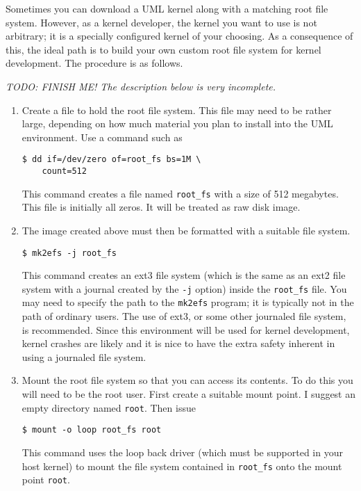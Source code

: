 \documentclass{article}
\newcommand{\command}[1]{\texttt{#1}}    %
\newcommand{\filename}[1]{\texttt{#1}}   %
\newcommand{\todo}[1]{\textit{TODO: #1}}
\begin{document}
Sometimes you can download a UML kernel along with a matching root file system. However, as a
kernel developer, the kernel you want to use is not arbitrary; it is a specially configured
kernel of your choosing. As a consequence of this, the ideal path is to build your own custom
root file system for kernel development. The procedure is as follows.

\todo{FINISH ME! The description below is very incomplete.}

\begin{enumerate}

\item Create a file to hold the root file system. This file may need to be rather large,
  depending on how much material you plan to install into the UML environment. Use a command
  such as
\begin{verbatim}
$ dd if=/dev/zero of=root_fs bs=1M \
    count=512
\end{verbatim}
  This command creates a file named \filename{root\_fs} with a size of 512 megabytes. This file
  is initially all zeros. It will be treated as raw disk image.

\item The image created above must then be formatted with a suitable file system.
\begin{verbatim}
$ mk2efs -j root_fs
\end{verbatim}
  This command creates an ext3 file system (which is the same as an ext2 file system with a
  journal created by the \texttt{-j} option) inside the \filename{root\_fs} file. You may need
  to specify the path to the \command{mk2efs} program; it is typically not in the path of
  ordinary users. The use of ext3, or some other journaled file system, is recommended. Since
  this environment will be used for kernel development, kernel crashes are likely and it is nice
  to have the extra safety inherent in using a journaled file system.

\item Mount the root file system so that you can access its contents. To do this you will need
  to be the root user. First create a suitable mount point. I suggest an empty directory named
  \filename{root}. Then issue
\begin{verbatim}
$ mount -o loop root_fs root
\end{verbatim}
  This command uses the loop back driver (which must be supported in your host kernel) to mount
  the file system contained in \filename{root\_fs} onto the mount point \filename{root}.


\end{enumerate}
\end{document}
